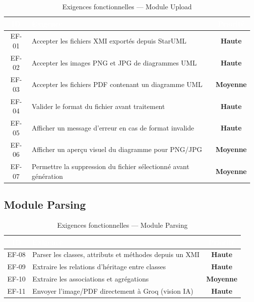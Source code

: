 \documentclass[12pt,a4paper]{article}
\newcommand{\badge}[2]{%
  \colorbox{#1!15}{\textcolor{#1}{\small\textbf{#2}}}%
}
\newcommand{\highpriority}{\badge{dangered}{Haute}}
\newcommand{\mediumpriority}{\badge{warningorange}{Moyenne}}
\begin{document}
\begin{table}[H]
\centering
\renewcommand{\arraystretch}{1.3}
\begin{tabularx}{\textwidth}{|c|X|c|}
\hline
\rowcolor{darkblue!90}
\textcolor{white}{\textbf{ID}} &
\textcolor{white}{\textbf{Exigence}} &
\textcolor{white}{\textbf{Priorité}} \\
\hline
EF-01 & Accepter les fichiers XMI exportés depuis StarUML & \highpriority \\
\hline
\rowcolor{lightgray}
EF-02 & Accepter les images PNG et JPG de diagrammes UML & \highpriority \\
\hline
EF-03 & Accepter les fichiers PDF contenant un diagramme UML & \mediumpriority \\
\hline
\rowcolor{lightgray}
EF-04 & Valider le format du fichier avant traitement & \highpriority \\
\hline
EF-05 & Afficher un message d'erreur en cas de format invalide & \highpriority \\
\hline
\rowcolor{lightgray}
EF-06 & Afficher un aperçu visuel du diagramme pour PNG/JPG & \mediumpriority \\
\hline
EF-07 & Permettre la suppression du fichier sélectionné avant génération & \mediumpriority \\
\hline
\end{tabularx}
\caption{Exigences fonctionnelles — Module Upload}
\end{table}

\subsection{Module Parsing}

\begin{table}[H]
\centering
\renewcommand{\arraystretch}{1.3}
\begin{tabularx}{\textwidth}{|c|X|c|}
\hline
\rowcolor{darkblue!90}
\textcolor{white}{\textbf{ID}} &
\textcolor{white}{\textbf{Exigence}} &
\textcolor{white}{\textbf{Priorité}} \\
\hline
EF-08 & Parser les classes, attributs et méthodes depuis un XMI & \highpriority \\
\hline
\rowcolor{lightgray}
EF-09 & Extraire les relations d'héritage entre classes & \highpriority \\
\hline
EF-10 & Extraire les associations et agrégations & \mediumpriority \\
\hline
\rowcolor{lightgray}
EF-11 & Envoyer l'image/PDF directement à Groq (vision IA) & \highpriority \\
\hline
\end{tabularx}
\caption{Exigences fonctionnelles — Module Parsing}
\end{table}
\end{document}
